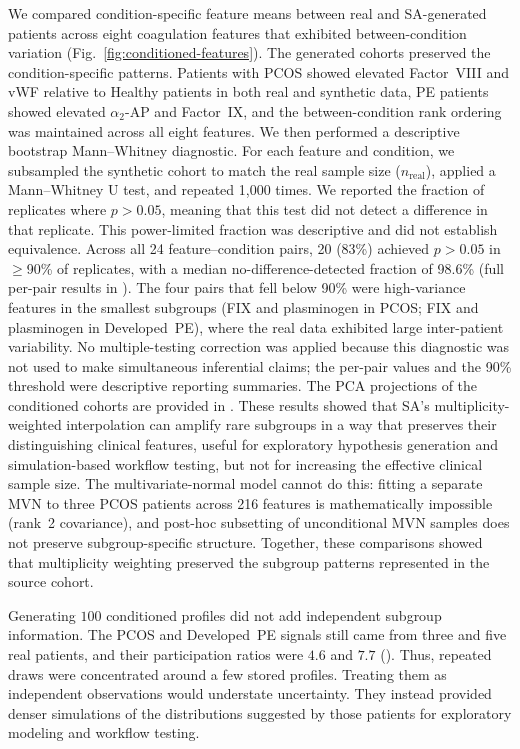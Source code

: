 We compared condition-specific feature means between real and SA-generated patients
across eight coagulation features that exhibited between-condition variation
(Fig.~\ref{fig:conditioned-features}). The generated cohorts preserved the
condition-specific patterns. Patients with PCOS showed elevated Factor~VIII and vWF
relative to Healthy patients in both real and synthetic data, PE patients showed
elevated $\alpha_2$-AP and Factor~IX, and the between-condition rank ordering was
maintained across all eight features. We then performed a descriptive bootstrap
Mann--Whitney diagnostic. For each feature and condition, we subsampled the
synthetic cohort to match the real sample size ($n_{\text{real}}$), applied a
Mann--Whitney U test, and repeated 1,000 times. We reported the fraction of
replicates where $p > 0.05$, meaning that this test did not detect a difference in
that replicate. This power-limited fraction was descriptive and did not establish
equivalence. Across all 24 feature--condition pairs, 20 (83\%) achieved
$p > 0.05$ in $\geq$90\% of replicates, with a median
no-difference-detected fraction of 98.6\% (full per-pair results in
). The four pairs that fell below 90\% were
high-variance features in the smallest subgroups (FIX and plasminogen in PCOS;
FIX and plasminogen in Developed~PE), where the real data exhibited large
inter-patient variability. No multiple-testing correction was applied because this
diagnostic was not used to make simultaneous inferential claims; the per-pair values and the
90\% threshold were descriptive reporting summaries. The PCA projections of the conditioned cohorts are provided in
. These results showed that SA's multiplicity-weighted
interpolation can amplify rare subgroups in a way that preserves their distinguishing
clinical features, useful for exploratory hypothesis generation and simulation-based
workflow testing, but not for increasing the effective clinical sample size. The multivariate-normal model cannot do this:
fitting a separate MVN to three PCOS patients across 216 features is mathematically
impossible (rank~2 covariance), and post-hoc subsetting of unconditional MVN samples
does not preserve subgroup-specific structure. Together, these comparisons showed that
multiplicity weighting preserved the subgroup patterns represented in the source cohort.

Generating $100$ conditioned profiles did not add independent subgroup information.
The PCOS and Developed~PE signals still came from three and five real patients, and their
participation ratios were $4.6$ and $7.7$ (). Thus, repeated draws
were concentrated around a few stored profiles. Treating them as independent observations
would understate uncertainty. They instead provided denser simulations of the distributions
suggested by those patients for exploratory modeling and workflow testing.


